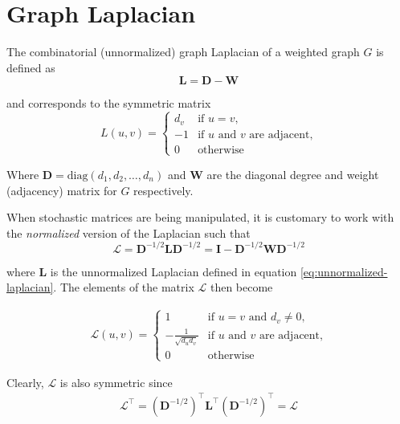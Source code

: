 \documentclass[12pt, oneside, extrafontsizes]{memoir}  %
\def\transpose{\intercal}
\def\laplacian{\mathbf{\mathcal{L}}}
\theoremstyle{plain}
\theoremstyle{definition}
\begin{document}

\section{Graph Laplacian}
\label{sec:laplacian}

The combinatorial (unnormalized) graph Laplacian of a weighted graph $G$ is defined
as
\begin{equation}
\mathbf{L} = \mathbf{D} - \mathbf{W}
\label{eq:unnormalized-laplacian}
\end{equation}

and corresponds to the symmetric matrix
\begin{equation}
L(u,v) = 
\begin{cases}
d_v & \mbox{if $u = v$,} \\
-1 & \text{if $u$ and $v$ are adjacent,} \\
0 & \text{otherwise}
\end{cases}
\end{equation}

Where $\mathbf{D} = \text{diag}(d_1, d_2, \dots, d_n)$ and $\mathbf{W}$ are the
diagonal degree and weight (adjacency) matrix for $G$ respectively.

When stochastic matrices are being manipulated, it is customary to work with the
\textit{normalized}
version of the Laplacian such that
\begin{equation}
\laplacian = \mathbf{D}^{-1/2} \mathbf{L} \mathbf{D}^{-1/2} = \mathbf{I} -
\mathbf{D}^{-1/2} \mathbf{W} \mathbf{D}^{-1/2}
\label{eq:normalized-laplacian}
\end{equation}	

where $\mathbf{L}$ is the unnormalized Laplacian defined in equation
\ref{eq:unnormalized-laplacian}.  The elements of the matrix $\laplacian$ then become

\begin{align}
\laplacian(u,v) = 
\begin{cases}
1 & \text{if $u = v$ and $d_v \neq 0$,} \\
-\frac{1}{\sqrt{d_u d_v}} & \text{if $u$ and $v$ are adjacent,}\\
0 & \text{otherwise}
\end{cases}
\end{align}

Clearly, $\laplacian$ is also symmetric since
\begin{align}
\laplacian^\transpose = \left(\mathbf{D}^{-1/2} \right)^\transpose \mathbf{L}^\transpose \left( \mathbf{D}^{-1/2} \right)^\transpose = \laplacian
\end{align}
\end{document}
